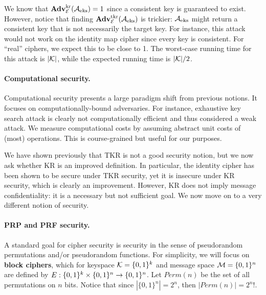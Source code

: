 We know that $\mathbf{Adv}^{\mathrm{kr}}_{{\cal E}}({\mathcal A}_{\textnormal{eks}}) = 1$ since a consistent key is guaranteed to exist. However, notice that finding $\mathbf{Adv}^{\mathrm{tkr}}_{{\cal E}}({\mathcal A}_{\textnormal{eks}})$ is trickier: ${\mathcal A}_{\textnormal{eks}}$ might return a consistent key that is not necessarily the target key. For instance, this attack would not work on the identity map cipher since every key is consistent. For ``real'' ciphers, we expect this to be close to 1. 
The worst-case running time for this attack is $|{\cal K}|$, while the expected running time is $|{\cal K}|/2$.

\paragraph{Computational security.} Computational security presents a large paradigm shift from previous notions. It focuses on computationally-bound adversaries. For instance, exhaustive key search attack is clearly not computationally efficient and thus considered a weak attack. We measure computational costs by assuming abstract unit costs of (most) operations. This is course-grained but useful for our purposes. 

We have shown previously that TKR is not a good security notion, but we now ask whether KR is an improved definition. In particular, the identity cipher has been shown to be secure under TKR security, yet it is insecure under KR security, which is clearly an improvement. However, KR does not imply message confidentiality: it is a necessary but not sufficient goal. We now move on to a very different notion of security.

\paragraph{PRP and PRF security.} A standard goal for cipher security is security in the sense of pseudorandom permutations and/or pseudorandom functions. For simplicity, we will focus on \textbf{block ciphers}, which for keyspace ${\cal K}=\{0,1\}^k$ and message space ${\cal M}=\{0,1\}^n$ are defined by $E : \{0,1\}^k \times \{0,1\}^n \to \{0,1\}^n$. Let $Perm(n)$ be the set of all permutations on $n$ bits. Notice that since $|\{0,1\}^n| = 2^n$, then $|Perm(n)| = 2^n!$. %

